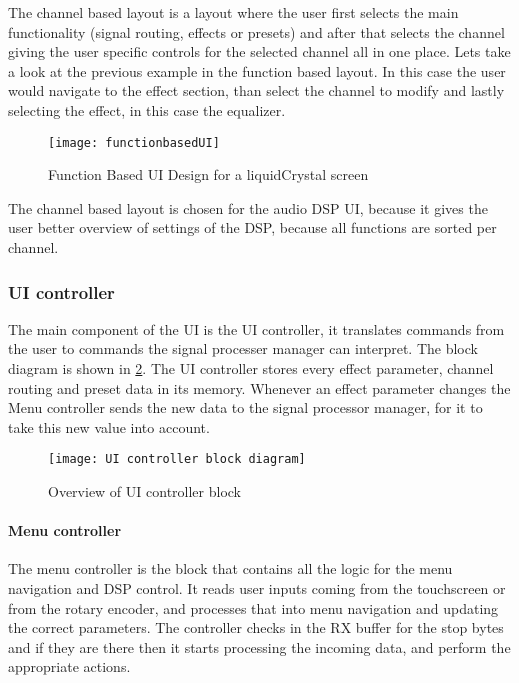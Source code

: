 The channel based layout is a layout where the user first selects the main functionality (signal routing, effects or presets) and after that selects the channel giving the user specific controls for the selected channel all in one place. Lets take a look at the previous example in the function based layout. In this case the user would navigate to the effect section, than select the channel to modify and lastly selecting the effect, in this case the equalizer.

\begin{figure}[ht]
    \texttt{[image: functionbasedUI]}
    \caption{Function Based UI Design for a liquidCrystal screen}
    \label{fig:functionbasedUI}
\end{figure}

The channel based layout is chosen for the audio DSP UI, because it gives the user better overview of settings of the DSP, because all functions are sorted per channel.

\subsubsection{UI controller}
The main component of the UI is the UI controller, it translates commands from the user to commands the signal processer manager can interpret. The block diagram is shown in \ref{fig:UIcontroller-block-diagram}. The UI controller stores every effect parameter, channel routing and preset data in its memory. Whenever an effect parameter changes the Menu controller sends the new data to the signal processor manager, for it to take this new value into account. 

\begin{figure}[ht]
    \texttt{[image: UI controller block diagram]}
    \caption{Overview of UI controller block}
    \label{fig:UIcontroller-block-diagram}
\end{figure}

\paragraph{Menu controller}
The menu controller is the block that contains all the logic for the menu navigation and DSP control. It reads user inputs coming from the touchscreen or from the rotary encoder, and processes that into menu navigation and updating the correct parameters. The controller checks in the RX buffer for the stop bytes and if they are there then it starts processing the incoming data, and perform the appropriate actions.

